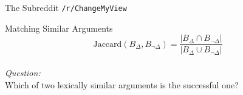 \documentclass{beamer}
\begin{document}
\begin{frame}{The Subreddit \texttt{/r/ChangeMyView}}
\begin{figure}
\end{figure}
\end{frame}

\begin{frame}{Matching Similar Arguments}\centering
\begin{equation*}
\text{Jaccard}(B_\Delta,B_{\neg\Delta})=\dfrac{|B_\Delta\cap B_{\neg\Delta}|}{|B_\Delta\cup B_{\neg\Delta}|}
\end{equation*}
\vspace{2em}\\
\large{\emph{Question:}\\Which of two lexically similar arguments is the successful one?}
\end{frame}
\end{document}
